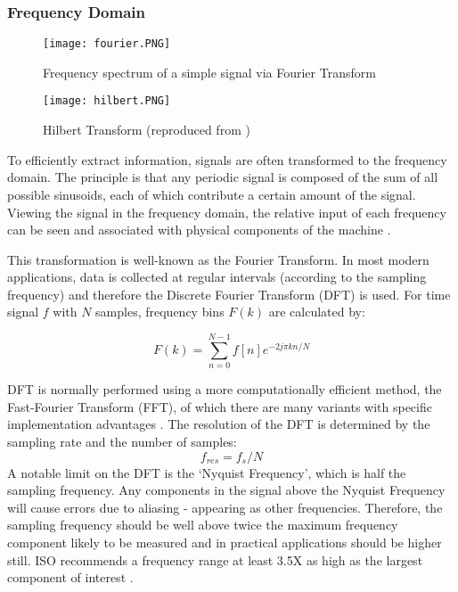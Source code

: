 \subsubsection{Frequency Domain}

\begin{figure}
    \centering
    \texttt{[image: fourier.PNG]}
    \caption{Frequency spectrum of a simple signal via Fourier Transform}
    \label{fig:fourier}
\end{figure}

\begin{figure}
    \centering
    \texttt{[image: hilbert.PNG]}
    \caption{Hilbert Transform (reproduced from \cite{CM_hilbert})}
    \label{fig:hilbert}
\end{figure}

To efficiently extract information, signals are often transformed to the frequency domain.
The principle is that any periodic signal is composed of the sum of all possible sinusoids, each of which contribute a certain amount of the signal.
Viewing the signal in the frequency domain, the relative input of each frequency can be seen and associated with physical components of the machine \cite{CM_randall}.
\par

This transformation is well-known as the Fourier Transform.
In most modern applications, data is collected at regular intervals (according to the sampling frequency) and therefore the Discrete Fourier Transform (DFT) is used.
For time signal $f$ with $N$ samples, frequency bins $F(k)$ are calculated by:

\begin{equation} %
F(k) = \sum^{N-1}_{n=0} f[n]e^{-2j\pi kn/N}
\end{equation}

DFT is normally performed using a more computationally efficient method, the Fast-Fourier Transform (FFT), of which there are many variants with specific implementation advantages \cite{CM_randall}.
The resolution of the DFT is determined by the sampling rate and the number of samples:
\begin{equation}
    f_{res} = f_{s} / N
\end{equation}
A notable limit on the DFT is the `Nyquist Frequency', which is half the sampling frequency.
Any components in the signal above the Nyquist Frequency will cause errors due to aliasing - appearing as other frequencies.
Therefore, the sampling frequency should be well above twice the maximum frequency component likely to be measured and in practical applications should be higher still.
ISO recommends a frequency range at least 3.5X as high as the largest component of interest \cite{ISO13373-1}.
\par

